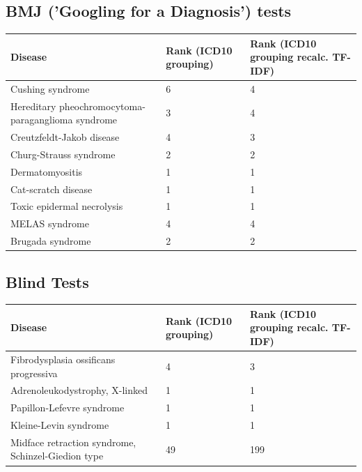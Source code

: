 \documentclass[10pt,letterpaper,final]{article}
\begin{document}
\subsection{BMJ ('Googling for a Diagnosis') tests }
\label{app:bmj_icd10_icd10recalc}
\begin{center}
\begin{small}
	\begin{tabular}{|p{6cm}|p{2.5cm}|p{2.5cm}|}
	\hline
	\textbf{Disease}  & \textbf{Rank (ICD10 grouping)} & \textbf{Rank (ICD10 grouping recalc. TF-IDF)} \\
	\hline\hline
Cushing syndrome & 6 & 4\\    \hline
Hereditary pheochromocytoma-paraganglioma syndrome & 3 & 4\\    \hline
Creutzfeldt-Jakob disease & 4 & 3\\    \hline
Churg-Strauss syndrome & 2 & 2\\    \hline
Dermatomyositis & 1 & 1\\    \hline
Cat-scratch disease & 1 & 1\\    \hline
Toxic epidermal necrolysis & 1 & 1\\    \hline
MELAS syndrome & 4 & 4\\    \hline
Brugada syndrome & 2 & 2\\    \hline
	\end{tabular}
\end{small}
\end{center}

\subsection{Blind Tests}
\label{app:blind_icd10_icd10recalc}
\begin{center}
\begin{small}
	\begin{tabular}{|p{6cm}|p{2.5cm}|p{2.5cm}|}
	\hline
	\textbf{Disease}  & \textbf{Rank (ICD10 grouping)} & \textbf{Rank (ICD10 grouping recalc. TF-IDF)} \\
	\hline\hline
Fibrodysplasia ossificans progressiva & 4 & 3\\    \hline
Adrenoleukodystrophy, X-linked & 1 & 1\\    \hline
Papillon-Lefevre syndrome & 1 & 1\\    \hline
Kleine-Levin syndrome & 1 & 1\\    \hline
Midface retraction syndrome, Schinzel-Giedion type & 49 & 199\\    \hline
	\end{tabular}
\end{small}
\end{center}
\end{document}
